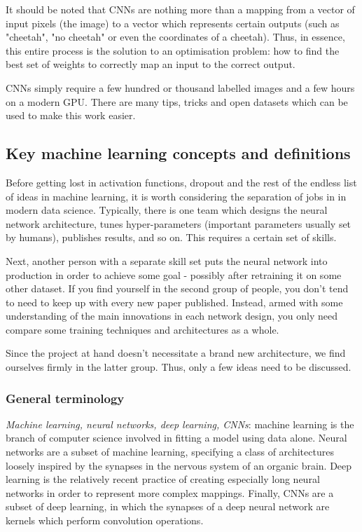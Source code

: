 It should be noted that CNNs are nothing more than a mapping from a vector of input pixels (the image) to a vector which represents certain outputs (such as "cheetah", "no cheetah" or even the coordinates of a cheetah). Thus, in essence, this entire process is the solution to an optimisation problem: how to find the best set of weights to correctly map an input to the correct output.

CNNs simply require a few hundred or thousand labelled images and a few hours on a modern GPU. There are many tips, tricks and open datasets which can be used to make this work easier.

\subsection{Key machine learning concepts and definitions}
Before getting lost in activation functions, dropout and the rest of the endless list of ideas in machine learning, it is worth considering the separation of jobs in in modern data science. Typically, there is one team which designs the neural network architecture, tunes hyper-parameters (important parameters usually set by humans), publishes results, and so on. This requires a certain set of skills.

Next, another person with a separate skill set puts the neural network into production in order to achieve some goal - possibly after retraining it on some other dataset. If you find yourself in the second group of people, you don't tend to need to keep up with every new paper published. Instead, armed with some understanding of the main innovations in each network design, you only need compare some training techniques and architectures as a whole.

Since the project at hand doesn't necessitate a brand new architecture, we find ourselves firmly in the latter group. Thus, only a few ideas need to be discussed.

\subsubsection{General terminology}

\textit{Machine learning, neural networks, deep learning, CNNs}: machine learning is the branch of computer science involved in fitting a model using data alone. Neural networks are a subset of machine learning, specifying a class of architectures loosely inspired by the synapses in the nervous system of an organic brain. Deep learning is the relatively recent practice of creating especially long neural networks in order to represent more complex mappings. Finally, CNNs are a subset of deep learning, in which the synapses of a deep neural network are kernels which perform convolution operations.

